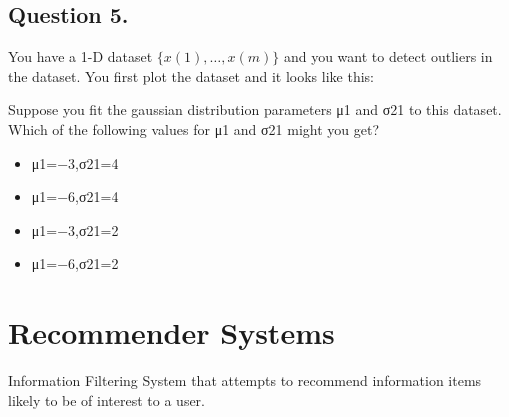 \subsection*{Question 5. }
You have a 1-D dataset $\{x(1),\ldots,x(m)\}$ and you want to detect outliers in the dataset. You first plot the dataset and it looks like this:


Suppose you fit the gaussian distribution parameters μ1 and σ21 to this dataset. Which of the following values for μ1 and σ21 might you get?
\begin{itemize}
\item μ1=−3,σ21=4
\item 
μ1=−6,σ21=4
\item
μ1=−3,σ21=2
\item 
μ1=−6,σ21=2
\end{itemize}




\section{Recommender Systems}

Information Filtering System that attempts to recommend information items likely
to be of interest to a user.

